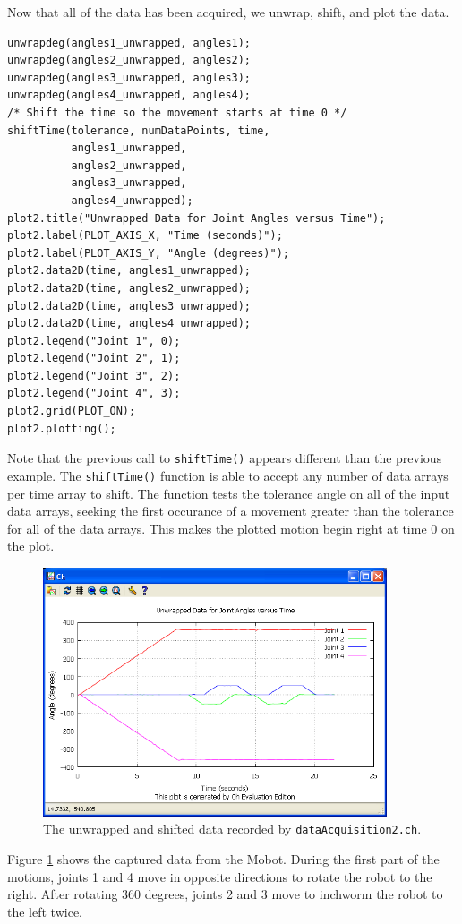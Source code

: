 \documentclass{article}
\begin{document}
Now that all of the data has been acquired, we unwrap, shift, and plot the data.
\begin{verbatim}
unwrapdeg(angles1_unwrapped, angles1);
unwrapdeg(angles2_unwrapped, angles2);
unwrapdeg(angles3_unwrapped, angles3);
unwrapdeg(angles4_unwrapped, angles4);
/* Shift the time so the movement starts at time 0 */
shiftTime(tolerance, numDataPoints, time, 
          angles1_unwrapped, 
          angles2_unwrapped, 
          angles3_unwrapped, 
          angles4_unwrapped);
plot2.title("Unwrapped Data for Joint Angles versus Time");
plot2.label(PLOT_AXIS_X, "Time (seconds)");
plot2.label(PLOT_AXIS_Y, "Angle (degrees)");
plot2.data2D(time, angles1_unwrapped);
plot2.data2D(time, angles2_unwrapped);
plot2.data2D(time, angles3_unwrapped);
plot2.data2D(time, angles4_unwrapped);
plot2.legend("Joint 1", 0);
plot2.legend("Joint 2", 1);
plot2.legend("Joint 3", 2);
plot2.legend("Joint 4", 3);
plot2.grid(PLOT_ON);
plot2.plotting();
\end{verbatim}
Note that the previous call to \texttt{shiftTime()} appears different than the previous
example. The \texttt{shiftTime()} function is able to accept any number of data
arrays per time array to shift. The function tests the tolerance angle on all of the
input data arrays, seeking the first occurance of a movement greater than the tolerance
for all of the data arrays. This makes the plotted motion begin right at time 0 on
the plot.

\begin{figure}[H]
\centering
\includegraphics[width=4in]{images/dataacq2_plot1.png}
\caption{\label{fig:dataacq2_fig1} The unwrapped and shifted data recorded by \texttt{dataAcquisition2.ch}.}
\end{figure}

Figure \ref{fig:dataacq2_fig1} shows the captured data from the Mobot. During the first
part of the motions, joints 1 and 4 move in opposite directions to rotate the robot to
the right. After rotating 360 degrees, joints 2 and 3 move to inchworm the robot to the
left twice.
\end{document}
